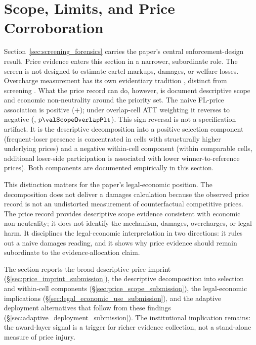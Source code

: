 \section{Scope, Limits, and Price Corroboration}
\label{sec:price_scope_conclusion}

Section~\ref{sec:screening_forensics} carries the paper's
central enforcement-design result. Price evidence enters this
section in a narrower, subordinate role. The screen is
not designed to estimate cartel markups, damages, or welfare
losses. Overcharge measurement has its own evidentiary tradition
\citep{bryant1991price,connor2007price}, distinct from screening
\citep{marshall2012economics,harrington2008detecting}. What the
price record can do, however, is document descriptive scope and
economic non-neutrality around the priority set. The
naive FL-price association is positive (+\valBetaBroad); under
overlap-cell ATT weighting it reverses to negative
(\valScopeOverlapCoef, $p\valScopeOverlapPlt$).
This sign reversal is not a specification artifact. It is the
descriptive decomposition into a positive selection component
(frequent-loser presence is concentrated in cells with
structurally higher underlying prices) and a negative within-cell
component (within comparable cells, additional loser-side
participation is associated with lower winner-to-reference
prices). Both components are documented empirically in this
section.

This distinction matters for the paper's legal-economic
position. The decomposition does not deliver a damages calculation
because the observed price record is not an undistorted
measurement of counterfactual competitive prices. The price
record provides descriptive scope evidence consistent with
economic non-neutrality; it does not identify the mechanism,
damages, overcharges, or legal harm. It disciplines the
legal-economic interpretation in two directions: it rules out a
naive damages reading, and it shows why price evidence should
remain subordinate to the evidence-allocation claim.

The section reports the broad descriptive price imprint
(\S\ref{sec:price_imprint_submission}), the descriptive
decomposition into selection and within-cell components
(\S\ref{sec:price_scope_submission}), the legal-economic
implications (\S\ref{sec:legal_economic_use_submission}), and
the adaptive deployment alternatives that follow from these
findings (\S\ref{sec:adaptive_deployment_submission}). The
institutional implication remains: the award-layer signal is a
trigger for richer evidence collection, not a stand-alone measure
of price injury.

